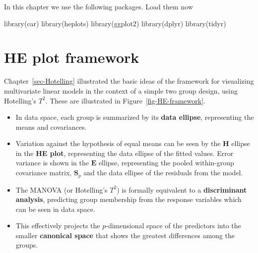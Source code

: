 \documentclass[
  letterpaper,
  10pt,
  krantz2]{krantz}
\makeatletter
\newenvironment{Shaded}{\begin{snugshade}}{\end{snugshade}}
\newcommand{\FunctionTok}[1]{\textcolor[rgb]{0.28,0.35,0.67}{#1}}
\newcommand{\NormalTok}[1]{\textcolor[rgb]{0.00,0.23,0.31}{#1}}
\newenvironment{kframe}{%
  \medskip{}
  \setlength{\fboxsep}{.8em}
  \def\at@end@of@kframe{}%
  \ifinner\ifhmode%
  \def\at@end@of@kframe{\end{minipage}}%
  \begin{minipage}{\columnwidth}%
  \fi\fi%
  \def\FrameCommand##1{\hskip\@totalleftmargin \hskip-\fboxsep
  \colorbox{shadecolor}{##1}\hskip-\fboxsep
      \hskip-\linewidth \hskip-\@totalleftmargin \hskip\columnwidth}%
  \MakeFramed {\advance\hsize-\width
    \@totalleftmargin\z@ \linewidth\hsize
    \@setminipage}}%
{\par\unskip\endMakeFramed%
  \at@end@of@kframe}
\renewenvironment{Shaded}{\begin{kframe}}{\end{kframe}}
\makeatother
\begin{document}
In this chapter we use the following packages. Load them now

\begin{Shaded}
\begin{Highlighting}[]
\FunctionTok{library}\NormalTok{(car)}
\FunctionTok{library}\NormalTok{(heplots)}
\FunctionTok{library}\NormalTok{(ggplot2)}
\FunctionTok{library}\NormalTok{(dplyr)}
\FunctionTok{library}\NormalTok{(tidyr)}
\end{Highlighting}
\end{Shaded}

\section{HE plot framework}\label{sec-he-framework}

Chapter~\ref{sec-Hotelling} illustrated the basic ideas of the framework
for visualizing multivariate linear models in the context of a simple
two group design, using Hotelling's \(T^2\). These are illustrated in
Figure~\ref{fig-HE-framework}.

\begin{itemize}
\item
  In data space, each group is summarized by its \textbf{data ellipse},
  representing the means and covariances.
\item
  Variation against the hypothesis of equal means can be seen by the
  \(\mathbf{H}\) ellipse in the \textbf{HE plot}, representing the data
  ellipse of the fitted values. Error variance is shown in the
  \(\mathbf{E}\) ellipse, representing the pooled within-group
  covariance matrix, \(\mathbf{S}_p\) and the data ellipse of the
  residuals from the model.
\item
  The MANOVA (or Hotelling's \(T^2\)) is formally equivalent to a
  \textbf{discriminant analysis}, predicting group membership from the
  response variables which can be seen in data space.
\item
  This effectively projects the \(p\)-dimensional space of the
  predictors into the smaller \textbf{canonical space} that shows the
  greatest differences among the groups.
\end{itemize}
\end{document}
